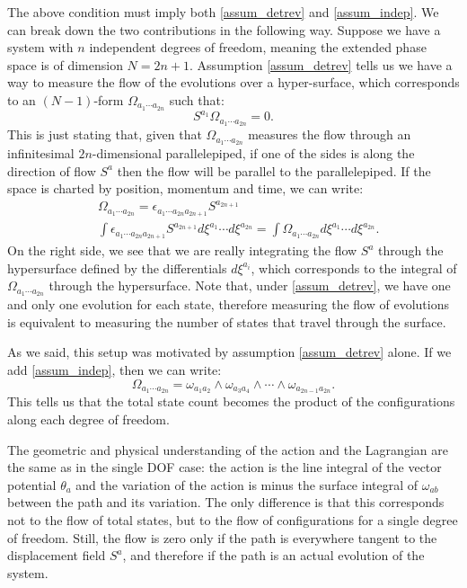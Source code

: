 The above condition must imply both \ref{assum_detrev} and \ref{assum_indep}. We can break down the two contributions in the following way. Suppose we have a system with $n$ independent degrees of freedom, meaning the extended phase space is of dimension $N=2n+1$. Assumption \ref{assum_detrev} tells us we have a way to measure the flow of the evolutions over a hyper-surface, which corresponds to an $(N-1)$-form $\Omega_{a_1 \cdots a_{2n}}$ such that:
\begin{equation}
	S^{a_1} \Omega_{a_1 \cdots a_{2n}} = 0.
\end{equation}
This is just stating that, given that $\Omega_{a_1 \cdots a_{2n}}$ measures the flow through an infinitesimal $2n$-dimensional parallelepiped, if one of the sides is along the direction of flow $S^a$ then the flow will be parallel to the parallelepiped. If the space is charted by position, momentum and time, we can write:
\begin{equation}
	\begin{aligned}
	&\Omega_{a_1 \cdots a_{2n}} = \epsilon_{a_1 \cdots a_{2n}a_{2n+1}} S^{a_{2n+1}} \\
	&\int \epsilon_{a_1 \cdots a_{2n}a_{2n+1}} S^{a_{2n+1}} d\xi^{a_1}\cdots d\xi^{a_{2n}} = \int \Omega_{a_1 \cdots a_{2n}} d\xi^{a_1}\cdots d\xi^{a_{2n}}.
	\end{aligned}
\end{equation}
On the right side, we see that we are really integrating the flow $S^a$ through the hypersurface defined by the differentials $d\xi^{a_i}$, which corresponds to the integral of $\Omega_{a_1 \cdots a_{2n}}$ through the hypersurface. Note that, under \ref{assum_detrev}, we have one and only one evolution for each state, therefore measuring the flow of evolutions is equivalent to measuring the number of states that travel through the surface.

As we said, this setup was motivated by assumption \ref{assum_detrev} alone. If we add \ref{assum_indep}, then we can write:
\begin{equation}
	\Omega_{a_1 \cdots a_{2n}} = \omega_{a_1 a_2} \wedge \omega_{a_3 a_4} \wedge \cdots \wedge \omega_{a_{2n-1} a_{2n}}.
\end{equation}
This tells us that the total state count becomes the product of the configurations along each degree of freedom.

The geometric and physical understanding of the action and the Lagrangian are the same as in the single DOF case: the action is the line integral of the vector potential $\theta_a$ and the variation of the action is minus the surface integral of $\omega_{ab}$ between the path and its variation. The only difference is that this corresponds not to the flow of total states, but to the flow of configurations for a single degree of freedom. Still, the flow is zero only if the path is everywhere tangent to the displacement field $S^a$, and therefore if the path is an actual evolution of the system.

